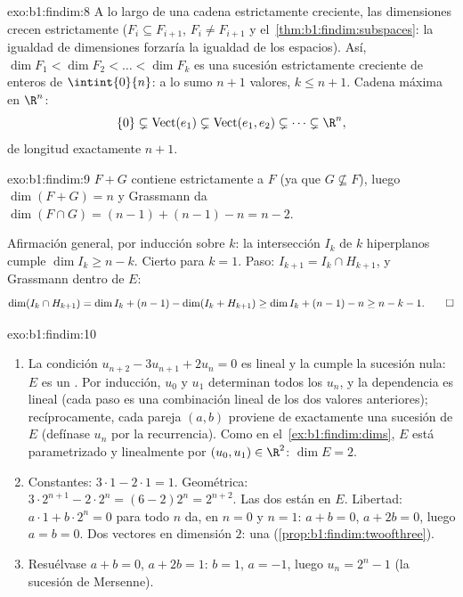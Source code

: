 \begin{solution}{exo:b1:findim:8}
A lo largo de una cadena estrictamente creciente, las dimensiones
crecen estrictamente ($F_i \subseteq F_{i+1}$, $F_i \neq F_{i+1}$ y
el~\cref{thm:b1:findim:subspaces}: la igualdad de dimensiones
forzaría la igualdad de los espacios). Así,
$\dim F_1 < \dim F_2 < \dots < \dim F_k$ es una sucesión
estrictamente creciente de enteros de $\intint{0}{n}$: a lo sumo
$n + 1$ valores, $k \leq n + 1$. Cadena máxima en $\R^n$:
\[
\{0\} \subsetneq \operatorname{Vect}(e_1) \subsetneq
\operatorname{Vect}(e_1, e_2) \subsetneq \dots \subsetneq \R^n ,
\]
de longitud exactamente $n + 1$.
\end{solution}

\begin{solution}{exo:b1:findim:9}
$F + G$ contiene estrictamente a $F$ (ya que $G \not\subseteq F$),
luego $\dim(F + G) = n$ y Grassmann da
$\dim(F \cap G) = (n-1) + (n-1) - n = n - 2$.

Afirmación general, por inducción sobre $k$: la intersección $I_k$ de
$k$ hiperplanos cumple $\dim I_k \geq n - k$. Cierto para $k = 1$.
Paso: $I_{k+1} = I_k \cap H_{k+1}$, y Grassmann dentro de $E$:
\[
\dim(I_k \cap H_{k+1}) = \dim I_k + (n - 1) - \dim(I_k + H_{k+1})
\geq \dim I_k + (n-1) - n \geq n - k - 1 . \qedhere
\]
\end{solution}

\begin{solution}{exo:b1:findim:10}
\begin{enumerate}
  \item La condición $u_{n+2} - 3u_{n+1} + 2u_n = 0$ es lineal y la
        cumple la sucesión nula: $E$ es un . Por inducción,
        $u_0$ y $u_1$ determinan todos los $u_n$, y la dependencia es
        lineal (cada paso es una combinación lineal de los dos
        valores anteriores); recíprocamente, cada pareja $(a, b)$
        proviene de exactamente una sucesión de $E$ (defínase $u_n$
        por la recurrencia). Como en el~\cref{ex:b1:findim:dims}, $E$
        está parametrizado  y linealmente por
        $(u_0, u_1) \in \R^2$: $\dim E = 2$.
  \item Constantes: $3\cdot1 - 2\cdot1 = 1$. Geométrica:
        $3\cdot 2^{n+1} - 2\cdot 2^n = (6 - 2)2^n = 2^{n+2}$. Las dos
        están en $E$. Libertad: $a\cdot 1 + b\cdot 2^n = 0$ para todo
        $n$ da, en $n = 0$ y $n = 1$: $a + b = 0$, $a + 2b = 0$,
        luego $a = b = 0$. Dos vectores  en dimensión $2$: una
         (\cref{prop:b1:findim:twoofthree}).
  \item Resuélvase $a + b = 0$, $a + 2b = 1$: $b = 1$, $a = -1$,
        luego $u_n = 2^n - 1$ (la sucesión de Mersenne).
\end{enumerate}
\end{solution}

